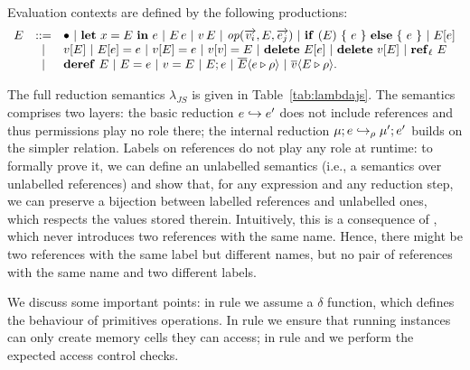 Evaluation contexts are defined by the following productions:
$$
\begin{array}{lcl}
E & ::= & \bullet ~|~ \mathbf{let}\ x = E\ \mathbf{in}\ e ~|~ E\, e~|~v\, E ~|~ \mathit{op}(\overrightarrow{v_i},E,\overrightarrow{e_j}) ~|~ \mathbf{if}\ (E)\ \{\ e\ \}\ \mathbf{else}\ \{\ e\ \} ~|~ E[e] \\
& | & v[E] ~|~ E[e] = e ~|~ v[E] = e ~|~ v[v] = E ~|~ \mathbf{delete}\ E[e] ~|~ \mathbf{delete}\ v[E] ~|~ \mathbf{ref}_{\ell}\ E \\
& | &  \mathbf{deref}\ E ~|~ E = e ~|~ v = E ~|~ E;e ~|~ \overline{E} \langle e \triangleright \rho \rangle~|~\overline{v} \langle E \triangleright \rho \rangle.
\end{array}
$$

The full reduction semantics $\lambda_{JS}$ is given in
Table~\ref{tab:lambdajs}. The semantics comprises two layers: the
basic reduction $e \hookrightarrow e'$ does not include references and thus
permissions play no role there; the internal reduction $\mu;e \hookrightarrow_\rho
\mu';e'$ builds on the simpler relation. Labels on references do not
play any role at runtime: to formally prove it, we can define an
unlabelled semantics (i.e., a semantics over unlabelled references) and
show that, for any expression and any reduction step, we can preserve
a bijection between labelled references and unlabelled ones, which
respects the values stored therein. Intuitively, this is a consequence
of , which never introduces two references with the same
name. Hence, there might be two references with the same label but
different names, but no pair of references with the same name and two
different labels.

We discuss some important points: in rule  we assume a $\delta$ function, which defines the behaviour of primitives operations. In rule  we ensure that running instances can only create memory cells they can access; in rule  and  we perform the expected access control checks.

